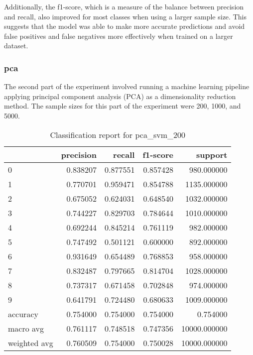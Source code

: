 Additionally, the f1-score, which is a measure of the balance between precision and recall, also improved for most classes when using a larger sample size. This suggests that the model was able to make more accurate predictions and avoid false positives and false negatives more effectively when trained on a larger dataset.


\subsubsection{\gls{pca}}\label{subsubsec:experiment_4_pca}

The second part of the experiment involved running a machine learning pipeline applying principal component analysis (PCA) as a dimensionality reduction method. The sample sizes for this part of the experiment were 200, 1000, and 5000.

\begin{table}[htb!]
    \centering
    \caption{Classification report for pca_svm_200}
    \label{tab:classification-report-pca_svm_200}
    \begin{tabular}{lrrrr}
    \toprule
    & precision & recall & f1-score & support \\
    \midrule
    0 & 0.838207 & 0.877551 & 0.857428 & 980.000000 \\
    1 & 0.770701 & 0.959471 & 0.854788 & 1135.000000 \\
    2 & 0.675052 & 0.624031 & 0.648540 & 1032.000000 \\
    3 & 0.744227 & 0.829703 & 0.784644 & 1010.000000 \\
    4 & 0.692244 & 0.845214 & 0.761119 & 982.000000 \\
    5 & 0.747492 & 0.501121 & 0.600000 & 892.000000 \\
    6 & 0.931649 & 0.654489 & 0.768853 & 958.000000 \\
    7 & 0.832487 & 0.797665 & 0.814704 & 1028.000000 \\
    8 & 0.737317 & 0.671458 & 0.702848 & 974.000000 \\
    9 & 0.641791 & 0.724480 & 0.680633 & 1009.000000 \\
    accuracy & 0.754000 & 0.754000 & 0.754000 & 0.754000 \\
    macro avg & 0.761117 & 0.748518 & 0.747356 & 10000.000000 \\
    weighted avg & 0.760509 & 0.754000 & 0.750028 & 10000.000000 \\
    \bottomrule
    \end{tabular}
\end{table}


